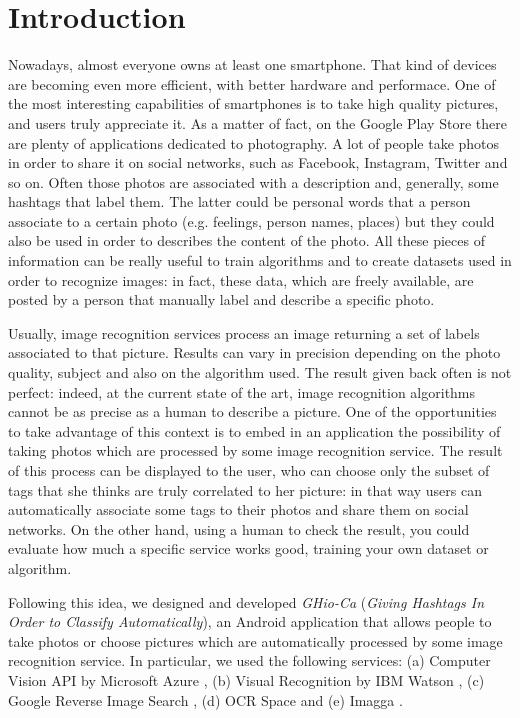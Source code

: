 \section{Introduction}
\label{sec:introduction}

Nowadays, almost everyone owns at least one smartphone. That kind of devices 
are becoming even more efficient, with better hardware and performace. One of 
the most interesting capabilities of smartphones is to take high quality 
pictures, and users truly appreciate it. As a matter of fact, on the Google 
Play Store there are plenty of applications dedicated to photography.
A lot of people take photos in order to share it on social networks, such as 
Facebook, Instagram, Twitter and so on. Often those photos are associated with 
a description and, generally, some hashtags that label them. The latter could 
be personal words that a person associate to a certain photo (e.g. feelings, 
person names, places) but they could also be used in order to describes the 
content of the photo.
All these pieces of information can be really useful to train algorithms and 
to create datasets used in order to recognize images: in fact, these data, 
which are freely available, are posted by a person that manually label and 
describe a specific photo.

Usually, image recognition services process an image returning a set of labels 
associated to that picture. Results can vary in precision depending on the 
photo quality, subject and also on the algorithm used. The result given back 
often is not perfect: indeed, at the current state of the art, image 
recognition algorithms cannot be as precise as a human to describe 
a picture. One of the opportunities to take advantage of this context is to 
embed in an application the possibility of taking photos which are processed 
by some image recognition service. The result of this process can be displayed 
to the user, who can choose only the subset of tags that she thinks are truly 
correlated to her picture: in that way users can automatically associate some 
tags to their photos and share them on social networks. On the other hand, 
using a human to check the result, you could evaluate how much a specific 
service works good, training your own dataset or algorithm.

Following this idea, we designed and developed \textit{GHio-Ca} (\textit{Giving 
Hashtags In Order to Classify Automatically}), an Android application that 
allows people to take photos or choose pictures which are automatically 
processed by some image recognition service. In particular, we used the 
following services: (a) Computer Vision API by Microsoft Azure \cite{Microsoft}
, (b) Visual Recognition by IBM Watson \cite{IBM}, (c) Google Reverse Image 
Search \cite{Google}, (d) OCR Space \cite{OCR} and (e) Imagga \cite{Imagga}.

